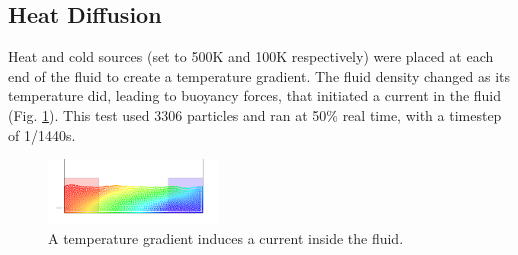 \documentclass[acmtog,review]{acmart}
\begin{document}
\subsection{Heat Diffusion}
Heat and cold sources (set to 500K and 100K respectively) were placed at each end of the fluid to create a temperature gradient. The fluid density changed as its temperature did, leading to buoyancy forces, that initiated a current in the fluid (Fig. \ref{diffuse}). This test used 3306 particles and ran at 50\% real time, with a timestep of 1/1440s. 
\begin{figure}[h]
  \includegraphics[width=0.4\textwidth]{diffusion.PNG}
  \caption{A temperature gradient induces a current inside the fluid.}
  \label{diffuse}
\end{figure}
\end{document}
